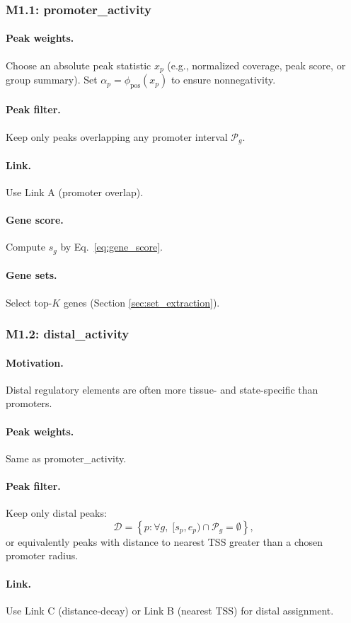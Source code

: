 \documentclass[11pt]{article}
\begin{document}
\subsubsection{M1.1: promoter\_activity}
\paragraph{Peak weights.} Choose an absolute peak statistic $x_p$ (e.g., normalized coverage, peak score, or group summary).
Set $\alpha_p=\phi_{\mathrm{pos}}(x_p)$ to ensure nonnegativity.
\paragraph{Peak filter.} Keep only peaks overlapping any promoter interval $\mathcal{P}_g$.
\paragraph{Link.} Use Link A (promoter overlap).
\paragraph{Gene score.} Compute $s_g$ by Eq.\ \ref{eq:gene_score}.
\paragraph{Gene sets.} Select top-$K$ genes (Section \ref{sec:set_extraction}).

\subsubsection{M1.2: distal\_activity}
\paragraph{Motivation.} Distal regulatory elements are often more tissue- and state-specific than promoters.
\paragraph{Peak weights.} Same as promoter\_activity.
\paragraph{Peak filter.} Keep only distal peaks:
\[
\mathcal{D} = \left\{ p : \forall g,\; [s_p,e_p) \cap \mathcal{P}_g = \emptyset \right\},
\]
or equivalently peaks with distance to nearest TSS greater than a chosen promoter radius.
\paragraph{Link.} Use Link C (distance-decay) or Link B (nearest TSS) for distal assignment.
\end{document}

